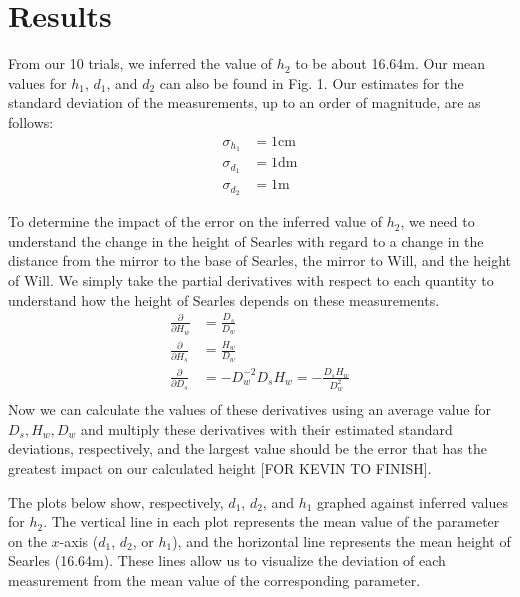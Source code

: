 \documentclass[11pt]{article}
\begin{document}
\section{Results}
From our 10 trials, we inferred the value of $h_2$ to be about 16.64m. Our mean values for $h_1$, $d_1$, and $d_2$ can also be found in Fig. 1. Our estimates for the standard deviation of the measurements, up to an order of magnitude, are as follows:
\begin{align*}
\sigma_{h_1} &= 1\text{cm} \\
\sigma_{d_1} &= 1\text{dm} \\
\sigma_{d_2} &= 1\text{m}
\end{align*}

To determine the impact of the error on the inferred value of $h_2$, we need to understand the change in the height of Searles with regard to a change in the distance from the mirror to the base of Searles, the mirror to Will, and the height of Will. We simply take the partial derivatives with respect to each quantity to understand how the height of Searles depends on these measurements. \\
\begin{align*}
    \frac{\partial}{\partial H_w} &= \frac{D_s}{D_w} \\
	\frac{\partial}{\partial H_s} &= \frac{H_w}{D_w} \\
	\frac{\partial}{\partial D_s} &= -D_w^{-2}D_sH_w = -\frac{D_sH_w}{D_w^2} \\
\end{align*}
Now we can calculate the values of these derivatives using an average value for $D_s, H_w, D_w$ and multiply these derivatives with their estimated standard deviations, respectively, and the largest value should be the error that has the greatest impact on our calculated height [FOR KEVIN TO FINISH].

The plots below show, respectively, $d_1$, $d_2$, and $h_1$ graphed against inferred values for $h_2$. The vertical line in each plot represents the mean value of the parameter on the $x$-axis ($d_1$, $d_2$, or $h_1$), and the horizontal line represents the mean height of Searles (16.64m). These lines allow us to visualize the deviation of each measurement from the mean value of the corresponding parameter.
\end{document}
